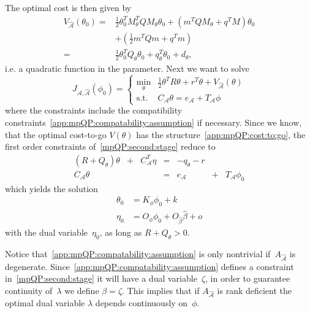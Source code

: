 \documentclass[journal]{IEEEtran}
\theoremstyle{remark}
\theoremstyle{definition}
\begin{document}
The optimal cost is then given by
%
\begin{equation}\label{app:mpQP:cost:to:go}\begin{split}
  V_{\hat{\mathcal A}}(\theta_0) = &\frac{1}{2}\theta^T_0 M_\theta^T Q M_\theta \theta_0 + \left(m^TQM_\theta + q^TM\right) \theta_0\\ 
  &+\left( \frac{1}{2} m^T Q m + q^T m\right)\\
  =&\frac{1}{2} \theta^T_0 Q_\theta \theta_0 + q^T_\theta \theta_0 + d_\theta,
\end{split}\end{equation}
%
i.e. a quadratic function in the parameter.
%
Next we want to solve
%
\begin{equation}\label{mpQP:second:stage}
  J_{\mathcal A,\hat{\mathcal A}}(\phi_0) = \left\{\begin{array}{rl}
  \min_\theta & \frac{1}{2}\theta^TR\theta + r^T\theta + V_{\hat{\mathcal A}}(\theta)\\
  \text{s.t.} & C_{\mathcal A}\theta = e_{\mathcal A} + T_{\mathcal A} \phi
  \end{array}\right.
\end{equation}
%
where the constraints include the compatibility constraints~\eqref{app:mpQP:compatability:assumption} if necessary. 
%
Since we know, that the optimal cost-to-go $V(\theta)$ has the structure~\eqref{app:mpQP:cost:to:go},
the first order constraints of~\eqref{mpQP:second:stage} reduce to
%
\begin{equation}\label{mpQP:second:stage:conditions}
  \begin{array}{ccccccc}
    (R + Q_\theta)\theta &+& C^T_{{\mathcal A}}\eta & = & -q_\theta-r && \\
    C_{{\mathcal A}} \theta & & & = & e_{{\mathcal A}}& +& T_{{\mathcal A}}\phi_0
  \end{array}
\end{equation}
%
which yields the solution
%
\begin{equation}
  \begin{split}
  \theta_0 &= K_\phi \phi_0 + k\\
  \eta_0 &= O_\phi \phi_0 + O_{\hat\beta} \hat\beta + o
  \end{split}
\end{equation}
%
with the dual variable~$\eta_0$, as long as $R+Q_\theta>0$.

Notice that~\eqref{app:mpQP:compatability:assumption} is only nontrivial if~$A_{\hat{\mathcal A}}$ is degenerate.
%
Since~\eqref{app:mpQP:compatability:assumption} defines a constraint in~\eqref{mpQP:second:stage} it will have a dual
variable~$\zeta$, in order to guarantee continuity of~$\lambda$ we define $\beta=\zeta$.
%
This implies that if $A_{\hat{\mathcal A}}$ is rank deficient the optimal dual variable $\lambda$
depends continuously on~$\phi$.
%
\end{document}
